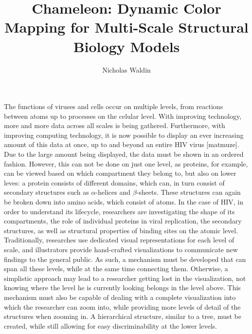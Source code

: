 \documentclass[review,journal]{vgtc}         %
\title{Chameleon: Dynamic Color Mapping	for Multi-Scale Structural Biology Models}
\author{Nicholas Waldin}
\begin{document}

\maketitle
The functions of viruses and cells occur on multiple levels, from reactions between atoms up to processes on the celular level. 
With improving technology, more and more data across all scales is being gathered. 
Furthermore, with improving computing technology, it is now possible to display an ever increasing amount of this data at once, up to and beyond an entire HIV virus [matmuze].
Due to the large amount being displayed, the data must be shown in an ordered fashion. 
However, this can not be done on just one level, as proteins, for example, can be viewed based on which compartment they belong to, but also on lower leves: a protein consists of different domains, which can, in turn consist of secondary structures such as $\alpha$-helices and $\beta$-sheets. 
These structures can again be broken down into amino acids, which consist of atoms. 
In the case of HIV, in order to understand its lifecycle, researchers are investigating the shape of its compartments, the role of individual proteins in viral replication, the secondary structures, as well as structural properties of binding sites on the atomic level. 
Traditionally, researches use dedicated visual representations for each level of scale, and illustrators provide hand-crafted visualizations to communicate new findings to the general public. 
As such, a mechanism must be developed that can span all these levels, while at the same time connecting them.
Otherwise, a simplistic approach may lead to a researcher getting lost in the visualization, not knowing where the level he is currently looking belongs in the level above.
This mechanism must also be capable of dealing with a complete visualization into which the researcher can zoom into, while providing more levels of detail of the structures when zooming in. 
A hierarchical structure, similar to a tree, must be created, while still allowing for easy discriminability at the lower levels.
 
\end{document}
